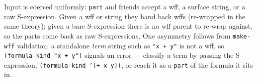 \begin{remark}
Input is coerced uniformly: \texttt{part} and friends accept a wff, a
surface string, or a raw S-expression.  Given a wff or string they hand
back wffs (re-wrapped in the same theory); given a bare S-expression there
is no wff parent to re-wrap against, so the parts come back as raw
S-expressions.  One asymmetry follows from \texttt{make-wff} validation: a
standalone \emph{term} string such as \texttt{"x + y"} is not a wff, so
\texttt{(formula-kind "x + y")} signals an error --- classify a term by
passing the S-expression, \texttt{(formula-kind '(+ x y))}, or reach it as
a \texttt{part} of the formula it sits in.
\end{remark}

